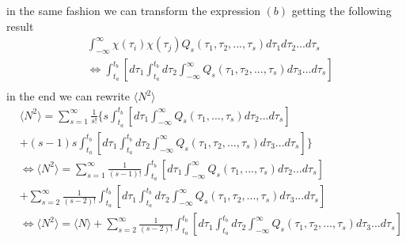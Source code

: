 in the same fashion we can transform the expression $(b)$ getting the following result
\begin{equation}
\begin{split}
& \int_{-\infty}^{\infty}\chi(\tau_i)\chi(\tau_j)Q_s(\tau_1,\tau_2,...,\tau_s)d\tau_1d\tau_2...d\tau_s \\
& \Leftrightarrow \int_{t_a}^{t_b}\left[d\tau_1\int_{t_a}^{t_b}d\tau_2\int_{-\infty}^{\infty}Q_s(\tau_1,\tau_2,...,\tau_s)d\tau_3...d\tau_s\right] \\
\end{split}
\end{equation}
in the end we can rewrite $\langle N^2 \rangle$
\begin{equation}
\begin{split}
&\langle N^2 \rangle=\sum_{s=1}^{\infty}\frac{1}{s!}\{s\int_{t_a}^{t_b}\left[d\tau_1 \int_{-\infty}^{\infty}Q_s(\tau_1,...,\tau_s)d\tau_2...d\tau_s\right] \\
& +(s-1)s\int_{t_a}^{t_b}\left[d\tau_1\int_{t_a}^{t_b}d\tau_2\int_{-\infty}^{\infty}Q_s(\tau_1,\tau_2,...,\tau_s)d\tau_3...d\tau_s\right] \} \\
&\Leftrightarrow \langle N^2 \rangle=\sum_{s=1}^{\infty}\frac{1}{(s-1)!}\int_{t_a}^{t_b}\left[d\tau_1 \int_{-\infty}^{\infty}Q_s(\tau_1,...,\tau_s)d\tau_2...d\tau_s\right]\\
& +\sum_{s=2}^{\infty}\frac{1}{(s-2)!}\int_{t_a}^{t_b}\left[d\tau_1\int_{t_a}^{t_b}d\tau_2\int_{-\infty}^{\infty}Q_s(\tau_1,\tau_2,...,\tau_s)d\tau_3...d\tau_s\right] \\
& \Leftrightarrow \langle N^2 \rangle=\langle N \rangle+\sum_{s=2}^{\infty}\frac{1}{(s-2)!}\int_{t_a}^{t_b}\left[d\tau_1\int_{t_a}^{t_b}d\tau_2\int_{-\infty}^{\infty}Q_s(\tau_1,\tau_2,...,\tau_s)d\tau_3...d\tau_s\right] \\
\end{split}
\end{equation}